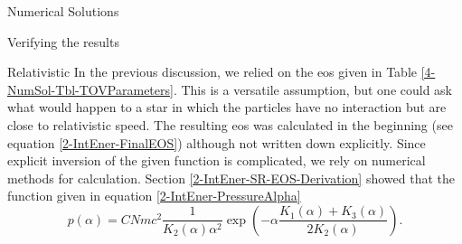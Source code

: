 \begin{section}{Numerical Solutions}
\begin{subsection}{Verifying the results}
% 
\end{subsection}
%
%
\begin{subsection}{Relativistic }
\label{4-NumSol-Sec-RelEOS}
In the previous discussion, we relied on the \ac{eos} given in Table \ref{4-NumSol-Tbl-TOVParameters}.
This is a versatile assumption, but one could ask what would happen to a star in which the particles have no interaction but are close to relativistic speed.
The resulting \ac{eos} was calculated in the beginning (see equation \eqref{2-IntEner-FinalEOS}) although not written down explicitly.
Since explicit inversion of the given function is complicated, we rely on numerical methods for calculation.
Section \ref{2-IntEner-SR-EOS-Derivation} showed that the function given in equation \eqref{2-IntEner-PressureAlpha}
\begin{equation}
	p(\alpha) = CNmc^2\frac{1}{K_2(\alpha)\alpha^2}\exp\left(-\alpha\frac{K_1(\alpha)+K_3(\alpha)}{2K_2(\alpha)}\right).

\end{equation}
\end{subsection}
\end{section}
